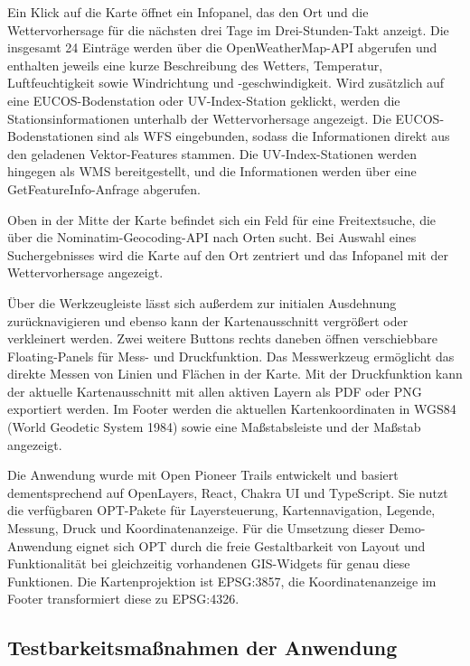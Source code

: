 Ein Klick auf die Karte öffnet ein Infopanel, das den Ort und die Wettervorhersage für die nächsten drei Tage im Drei-Stunden-Takt anzeigt. Die insgesamt 24 Einträge werden über die OpenWeatherMap-\ac{API} abgerufen und enthalten jeweils eine kurze Beschreibung des Wetters, Temperatur, Luftfeuchtigkeit sowie Windrichtung und -geschwindigkeit. Wird zusätzlich auf eine EUCOS-Bodenstation oder UV-Index-Station geklickt, werden die Stationsinformationen unterhalb der Wettervorhersage angezeigt. Die EUCOS-Bodenstationen sind als \ac{WFS} eingebunden, sodass die Informationen direkt aus den geladenen Vektor-Features stammen. Die UV-Index-Stationen werden hingegen als \ac{WMS} bereitgestellt, und die Informationen werden über eine GetFeatureInfo-Anfrage abgerufen.

Oben in der Mitte der Karte befindet sich ein Feld für eine Freitextsuche, die über die Nominatim-Geocoding-\ac{API} nach Orten sucht. Bei Auswahl eines Suchergebnisses wird die Karte auf den Ort zentriert und das Infopanel mit der Wettervorhersage angezeigt.

Über die Werkzeugleiste lässt sich außerdem zur initialen Ausdehnung zurücknavigieren und ebenso kann der Kartenausschnitt vergrößert oder verkleinert werden. Zwei weitere Buttons rechts daneben öffnen verschiebbare Floating-Panels für Mess- und Druckfunktion. Das Messwerkzeug ermöglicht das direkte Messen von Linien und Flächen in der Karte. Mit der Druckfunktion kann der aktuelle Kartenausschnitt mit allen aktiven Layern als PDF oder PNG exportiert werden. Im Footer werden die aktuellen Kartenkoordinaten in WGS84 (World Geodetic System 1984) sowie eine Maßstabsleiste und der Maßstab angezeigt.

Die Anwendung wurde mit Open Pioneer Trails entwickelt und basiert dementsprechend auf OpenLayers, React, Chakra UI und TypeScript. Sie nutzt die verfügbaren \ac{OPT}-Pakete für Layersteuerung, Kartennavigation, Legende, Messung, Druck und Koordinatenanzeige. Für die Umsetzung dieser Demo-Anwendung eignet sich \ac{OPT} durch die freie Gestaltbarkeit von Layout und Funktionalität bei gleichzeitig vorhandenen \ac{GIS}-Widgets für genau diese Funktionen. Die Kartenprojektion ist \ac{EPSG}:3857, die Koordinatenanzeige im Footer transformiert diese zu \ac{EPSG}:4326.

\subsection{Testbarkeitsmaßnahmen der Anwendung}

